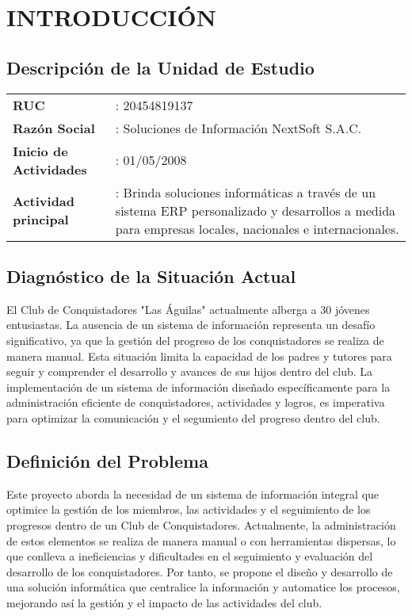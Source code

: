 \documentclass[stu, 12pt, letterpaper, donotrepeattitle, floatsintext, natbib]{apa7}
\begin{document}
\section{\large INTRODUCCI\'ON}

\subsection{Descripci\'on de la Unidad de Estudio}
\begin{tabular}{@{} p{4.3cm} p{9.5cm} @{}}
    \textbf{RUC}                   & : 20454819137                                                                                                                                         \\
    \textbf{Raz\'on Social}        & : Soluciones de Informaci\'on NextSoft S.A.C.                                                                                                         \\
    \textbf{Inicio de Actividades} & : 01/05/2008                                                                                                                                          \\
    \textbf{Actividad principal}   & : Brinda soluciones informáticas a través de un sistema ERP personalizado y desarrollos a medida para empresas locales, nacionales e internacionales.
\end{tabular}

\subsection{Diagn\'ostico de la Situaci\'on Actual}
El Club de Conquistadores "Las \'Aguilas" actualmente alberga a 30 j\'ovenes
entusiastas. La ausencia de un sistema de informaci\'on representa un desaf\'io
significativo, ya que la gesti\'on del progreso de los conquistadores se
realiza de manera manual. Esta situaci\'on limita la capacidad de los padres y
tutores para seguir y comprender el desarrollo y avances de sus hijos dentro
del club. La implementaci\'on de un sistema de informaci\'on dise\~{n}ado
espec\'ificamente para la administraci\'on eficiente de conquistadores,
actividades y logros, es imperativa para optimizar la comunicaci\'on y el
segumiento del progreso dentro del club.

\subsection{Definici\'on del Problema}
Este proyecto aborda la necesidad de un sistema de informaci\'on integral que
optimice la gesti\'on de los miembros, las actividades y el seguimiento de los
progresos dentro de un Club de Conquistadores. Actualmente, la administraci\'on
de estos elementos se realiza de manera manual o con herramientas dispersas, lo
que conlleva a ineficiencias y dificultades en el seguimiento y evaluaci\'on
del desarrollo de los conquistadores. Por tanto, se propone el diseño y
desarrollo de una soluci\'on inform\'atica que centralice la informaci\'on y
automatice los procesos, mejorando as\'i la gesti\'on y el impacto de las
actividades del club.
\end{document}

